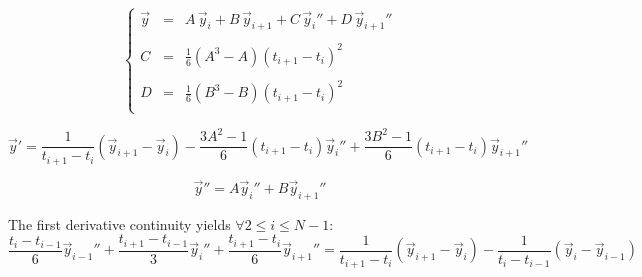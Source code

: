 \documentclass[aps,12pt]{revtex4}
\begin{document}
\begin{equation}
\left\lbrace
\begin{array}{rcl}
	\vec{y}   & = & A \, \vec{y}_i + B \, \vec{y}_{i+1} + C \, \vec{y}_i'' + D \, \vec{y}_{i+1}''\\
	\\
	C & = & \frac{1}{6} \left(A^3 - A\right) (t_{i+1}-t_i)^2\\
	\\
	D & = & \frac{1}{6} \left(B^3 - B\right) (t_{i+1}-t_i)^2\\
\end{array}
\right.
\end{equation}

\begin{equation}
	\vec{y}' = \dfrac{1}{t_{i+1}-t_i} \left(\vec{y}_{i+1}-\vec{y}_i\right) 
	- \dfrac{3A^2-1}{6} (t_{i+1}-t_i) \vec{y}_i''
	+ \dfrac{3B^2-1}{6} (t_{i+1}-t_i) \vec{y}_{i+1}''
\end{equation}	


\begin{equation}
	\vec{y}'' = A \vec{y}_i'' + B \vec{y}_{i+1}''
\end{equation}

The first derivative continuity yields $\forall 2\leq i \leq N-1$:
\begin{equation}
 	\dfrac{t_{i}-t_{i-1}}{6} \vec{y}_{i-1}'' + 
	\dfrac{t_{i+1}-t_{i-1}}{3} \vec{y}_i''
	+\dfrac{t_{i+1}-t_{i}}{6} \vec{y}_{i+1}''  = 
	\dfrac{1}{t_{i+1}-t_i} \left( \vec{y}_{i+1} - \vec{y}_{i} \right) -
	\dfrac{1}{t_{i}-t_{i-1}} \left( \vec{y}_i - \vec{y}_{i-1} \right) 
\end{equation}
\end{document}

